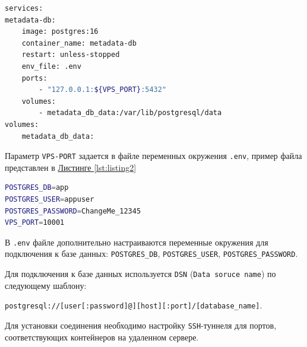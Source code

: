 \lstset{basicstyle=\ttfamily\small}
\begin{lstlisting}[language=bash, caption={docker-compose.yml файл для создания контейнера с СУБД	}, label={lst:listing1}]
services:
metadata-db:
	image: postgres:16
	container_name: metadata-db
	restart: unless-stopped
	env_file: .env
	ports:
		- "127.0.0.1:${VPS_PORT}:5432"
	volumes:
		- metadata_db_data:/var/lib/postgresql/data
volumes:
	metadata_db_data:
\end{lstlisting}

Параметр \texttt{VPS-PORT} задается в файле переменных окружения \texttt{.env}, пример файла представлен в  \hyperref[lst:listing2]{Листинге \ref*{lst:listing2}}

\begin{lstlisting}[language=bash, caption={.env файл для создания контейнера с СУБД}, label={lst:listing2}]
POSTGRES_DB=app
POSTGRES_USER=appuser
POSTGRES_PASSWORD=ChangeMe_12345
VPS_PORT=10001
\end{lstlisting}
В \texttt{.env} файле дополнительно настраиваются переменные окружения для подключения к базе данных: \texttt{POSTGRES\_DB}, \texttt{POSTGRES\_USER}, \texttt{POSTGRES\_PASSWORD}.

Для подключения к базе данных используется \texttt{DSN} (\texttt{Data soruce name}) по следующему шаблону:


\texttt{postgresql://[user[:password]@][host][:port]/[database\_name]}.

Для установки соединения необходимо настройку \texttt{SSH}-туннеля для портов, соответствующих контейнеров на удаленном сервере.

